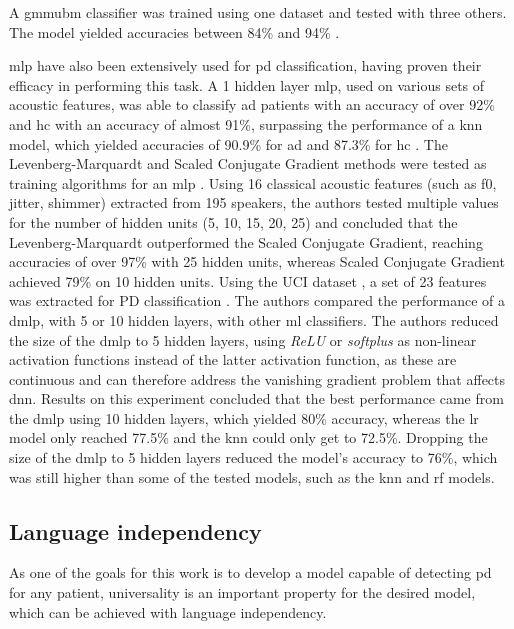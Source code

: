 A \gls{gmmubm} classifier was trained using one dataset and tested with three others. The model yielded accuracies between 84\% and 94\% \cite{parkinson_phonemic_relevance}.

\gls{mlp} have also been extensively used for \gls{pd} classification, having proven their efficacy in performing this task. A 1 hidden layer \gls{mlp}, used on various sets of acoustic features, was able to classify \gls{ad} patients with an accuracy of over 92\% and \gls{hc} with an accuracy of almost 91\%, surpassing the performance of a \gls{knn} model, which yielded accuracies of 90.9\% for \gls{ad} and 87.3\% for \gls{hc} \cite{alzheimer_2014_1}. The Levenberg-Marquardt and Scaled Conjugate Gradient methods were tested as training algorithms for an \gls{mlp} \cite{parkinson_mlp}. Using 16 classical acoustic features (such as \gls{f0}, jitter, shimmer) extracted from 195 speakers, the authors tested multiple values for the number of hidden units (5, 10, 15, 20, 25) and concluded that the Levenberg-Marquardt outperformed the Scaled Conjugate Gradient, reaching accuracies of over 97\% with 25 hidden units, whereas Scaled Conjugate Gradient achieved 79\% on 10 hidden units. Using the UCI dataset \cite{UCI}, a set of 23 features was extracted for PD classification \cite{deep_mlp_parkinson}. The authors compared the performance of a \gls{dmlp}, with 5 or 10 hidden layers, with other \gls{ml} classifiers. The authors reduced the size of the \gls{dmlp} to 5 hidden layers, using \textit{ReLU} or \textit{softplus} as non-linear activation functions instead of the latter activation function, as these are continuous and can therefore address the vanishing gradient problem that affects \gls{dnn}. Results on this experiment concluded that the best performance came from the \gls{dmlp} using 10 hidden layers, which yielded 80\% accuracy, whereas the \gls{lr} model only reached 77.5\% and the \gls{knn} could only get to 72.5\%. Dropping the size of the \gls{dmlp} to 5 hidden layers reduced the model's accuracy to 76\%, which was still higher than some of the tested models, such as the \gls{knn} and \gls{rf} models.

\subsection{Language independency}

As one of the goals for this work is to develop a model capable of detecting \gls{pd} for any patient, universality is an important property for the desired model, which can be achieved with language independency. 

